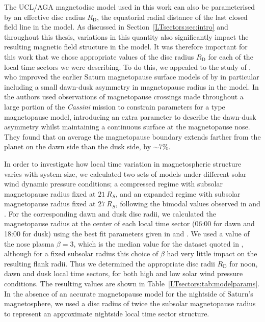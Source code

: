 The UCL/AGA magnetodisc model used in this work can also be parameterised by an effective disc radius $R_\mathrm{D}$, the equatorial radial distance of the last closed field line in the model. As discussed in Section~\ref{LTsectors:sec:intro} and throughout this thesis, variations in this quantity also significantly impact the resulting magnetic field structure in the model. It was therefore important for this work that we chose appropriate values of the disc radius $R_\mathrm{D}$ for each of the local time sectors we were describing. To do this, we appealed to the study of \citet{pilkington2015b}, who improved the earlier Saturn magnetopause surface models of \citet{pilkington2015, kanani2010, arridge2006} by in particular including a small dawn-dusk asymmetry in magnetopause radius in the model. In \citet{pilkington2015b} the authors used observations of magnetopause crossings made throughout a large portion of the \textit{Cassini} mission to constrain parameters for a \citet{shue1997} type magnetopause model, introducing an extra parameter to describe the dawn-dusk asymmetry whilst maintaining a continuous surface at the magnetopause nose. They found that on average the magnetopause boundary extends farther from the planet on the dawn side than the dusk side, by ${\sim}7\%$. 

In order to investigate how local time variation in magnetospheric structure varies with system size, we calculated two sets of models under different solar wind dynamic pressure conditions; a compressed regime with subsolar magnetopause radius fixed at $\SI{21}{R_S}$, and an expanded regime with subsolar magnetopause radius fixed at $\SI{27}{R_S}$, following the bimodal values observed in \citet{pilkington2015} and \citet{achilleos2008}. For the corresponding dawn and dusk disc radii, we calculated the magnetopause radius at the center of each local time sector (06:00 for dawn and 18:00 for dusk) using the best fit parameters given in \citet{pilkington2015} and \citet{pilkington2015b}. We used a value of the nose plasma $\beta = 3$, which is the median value for the dataset quoted in \citet{pilkington2015}, although for a fixed subsolar radius this choice of $\beta$ had very little impact on the resulting flank radii. Thus we determined the appropriate disc radii $R_\mathrm{D}$ for noon, dawn and dusk local time sectors, for both high and low solar wind pressure conditions. The resulting values are shown in Table~\ref{LTsectors:tab:modelparams}. In the absence of an accurate magnetopause model for the nightside of Saturn's magnetosphere, we used a disc radius of twice the subsolar magnetopause radius to represent an approximate nightside local time sector structure.

